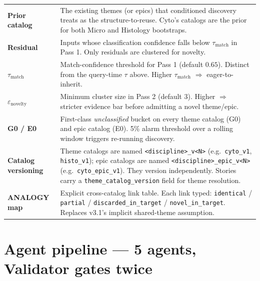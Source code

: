 \documentclass[10pt,letterpaper]{article}
\begin{document}
\begin{tabularx}{\textwidth}{@{}>{\bfseries}p{2.5cm}X@{}}
Prior catalog & The existing themes (or epics) that conditioned discovery treats as the structure-to-reuse. Cyto's catalogs are the prior for both Micro and Histology bootstraps.\\
Residual & Inputs whose classification confidence falls below $\tau_{\text{match}}$ in Pass 1. Only residuals are clustered for novelty.\\
$\tau_{\text{match}}$ & Match-confidence threshold for Pass 1 (default $0.65$). Distinct from the query-time $\tau$ above. Higher $\tau_{\text{match}}$ $\Rightarrow$ eager-to-inherit.\\
$\varepsilon_{\text{novelty}}$ & Minimum cluster size in Pass 2 (default $3$). Higher $\Rightarrow$ stricter evidence bar before admitting a novel theme/epic.\\
G0 / E0 & First-class \emph{unclassified} bucket on every theme catalog (G0) and epic catalog (E0). 5\% alarm threshold over a rolling window triggers re-running discovery.\\
Catalog versioning & Theme catalogs are named \texttt{<discipline>\_v<N>} (e.g.\ \texttt{cyto\_v1}, \texttt{histo\_v1}); epic catalogs are named \texttt{<discipline>\_epic\_v<N>} (e.g.\ \texttt{cyto\_epic\_v1}). They version independently. Stories carry a \texttt{theme\_catalog\_version} field for theme resolution.\\
ANALOGY map & Explicit cross-catalog link table. Each link typed: \texttt{identical} / \texttt{partial} / \texttt{discarded\_in\_target} / \texttt{novel\_in\_target}. Replaces v3.1's implicit shared-theme assumption.\\
\bottomrule
\end{tabularx}

\section{Agent pipeline --- 5 agents, Validator gates twice}
\end{document}

